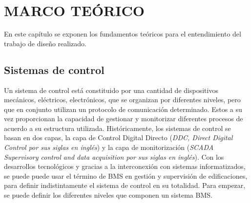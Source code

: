 \chapter{MARCO TEÓRICO}
\thispagestyle{empty}

\abovedisplayskip=0pt
\belowdisplayskip=10pt
\abovedisplayshortskip=0pt
\belowdisplayshortskip=10pt

En este capítulo se exponen los fundamentos teóricos para el entendimiento del trabajo de diseño realizado. 

\section{Sistemas de control}
Un sistema de control está constituido por una cantidad de dispositivos mecánicos, eléctricos, electrónicos, que se organizan por diferentes niveles, pero que en conjunto utilizan un protocolo de comunicación determinado. Estos a su vez proporcionan la capacidad de gestionar y monitorizar diferentes procesos de acuerdo a su estructura utilizada. Históricamente, los sistemas de control se basan en dos capas, la capa de Control Digital Directo (\textit{DDC, Direct Digital Control
por sus siglas en inglés}) y la capa de monitorización (\textit{SCADA Supervisory control and data acquisition por sus siglas en inglés})\cite{FundamentosControl}. Con los desarrollos tecnológicos y gracias a la interconexión con sistemas informatizados, se puede puede usar el término de BMS en gestión y supervisión de edificaciones, para definir indistintamente el sistema de control en su totalidad. Para empezar, se puede definir los diferentes niveles que componen un sistema BMS.

